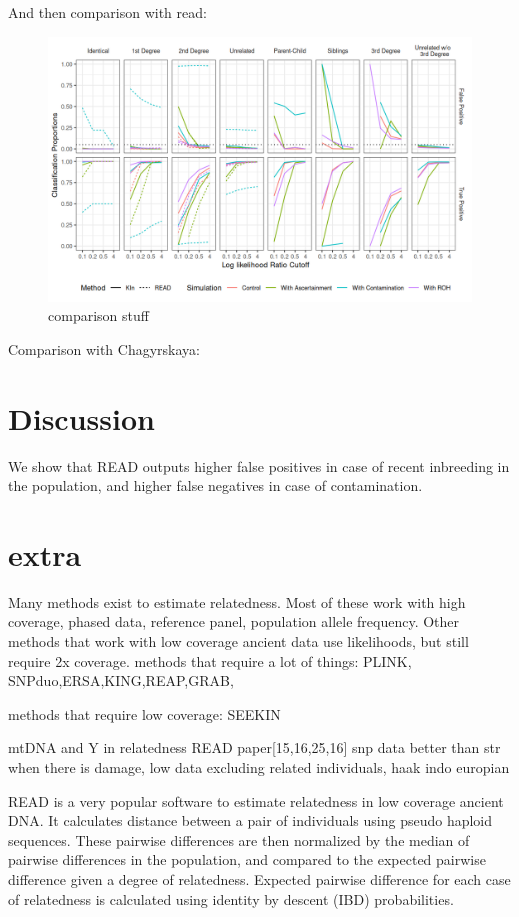 \documentclass[12pt, letterpaper]{article}
\begin{document}
And then comparison with read:
\begin{figure}[htp]
    \centering
    \includegraphics[width=18cm]{comparison_plot.png}
    \caption{comparison stuff}
    \label{fig:galaxy}
\end{figure}

Comparison with Chagyrskaya:






\section{Discussion}

We show that READ outputs higher false positives in case of recent inbreeding in the population, and higher false negatives in case of contamination. 


\section{extra}
Many methods exist to estimate relatedness. Most of these work with high coverage, phased data, reference panel, population allele frequency. Other methods that work with low coverage ancient data use likelihoods, but still require 2x coverage.
methods that require a lot of things: PLINK, SNPduo,ERSA,KING,REAP,GRAB,

methods that require low coverage: SEEKIN

mtDNA and Y in relatedness READ paper[15,16,25,16]
snp data better than str when there is damage, low data
excluding related individuals, haak indo europian

READ is a very popular software to estimate relatedness in low coverage ancient DNA. It calculates distance between a pair of individuals using pseudo haploid sequences. These pairwise differences are then normalized by the median of pairwise differences in the population, and compared to the expected pairwise difference given a degree of relatedness. Expected pairwise difference for each case of relatedness is calculated using identity by descent (IBD) probabilities. 
\end{document}
